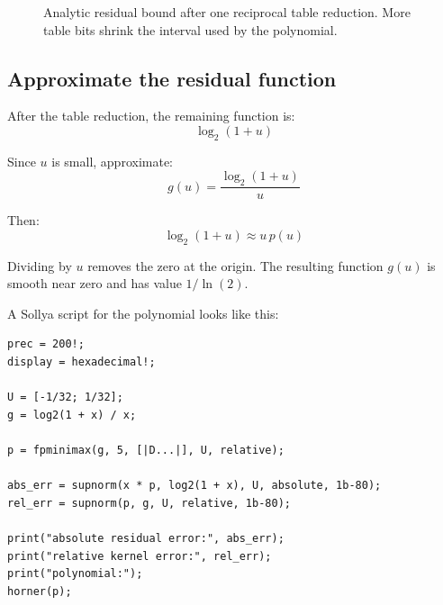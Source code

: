 \documentclass[manuscript, nonacm]{acmart}
\begin{document}
    \begin{figure}[H]
        \centering
        \caption{Analytic residual bound after one reciprocal table reduction.
        More table bits shrink the interval used by the polynomial.}
    \end{figure}
    \FloatBarrier

    \subsection{Approximate the residual function}

    After the table reduction, the remaining function is:
    \[ \log_2(1 + u) \]

    Since $u$ is small, approximate:
    \[ g(u) = \frac{\log_2(1 + u)}{u} \]

    Then:
    \[ \log_2(1 + u) \approx u\,p(u) \]

    Dividing by $u$ removes the zero at the origin. The resulting function
    $g(u)$ is smooth near zero and has value $1/\ln(2)$.

    A Sollya script for the polynomial looks like this:
    \begin{lstlisting}[style=sollya]
prec = 200!;
display = hexadecimal!;

U = [-1/32; 1/32];
g = log2(1 + x) / x;

p = fpminimax(g, 5, [|D...|], U, relative);

abs_err = supnorm(x * p, log2(1 + x), U, absolute, 1b-80);
rel_err = supnorm(p, g, U, relative, 1b-80);

print("absolute residual error:", abs_err);
print("relative kernel error:", rel_err);
print("polynomial:");
horner(p);
    \end{lstlisting}
\end{document}

